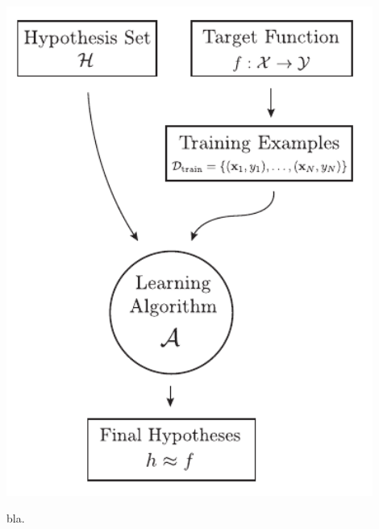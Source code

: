 \documentclass[a4paper, twoside]{tufte-book}
\begin{document}
\begin{marginfigure}
  \includegraphics[width=0.9\textwidth]{figures/learning_problem/learning_problem.pdf}
  \caption[blabla.]
    {bla.
    }
  \label{fig:ml:learning_problem}
\end{marginfigure}
\end{document}
